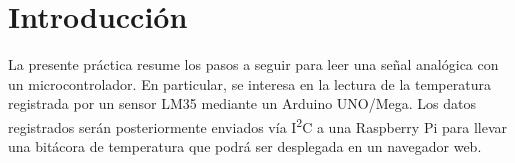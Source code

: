 %
%


\section{Introducción}%
\label{sec:introduction}
La presente práctica resume los pasos a seguir para leer una señal analógica con un microcontrolador.
En particular, se interesa en la lectura de la temperatura registrada por un sensor LM35 mediante un Arduino UNO/Mega.
Los datos registrados serán posteriormente enviados vía I\textsuperscript{2}C a una Raspberry Pi para llevar una bitácora de temperatura que podrá ser desplegada en un navegador web.




